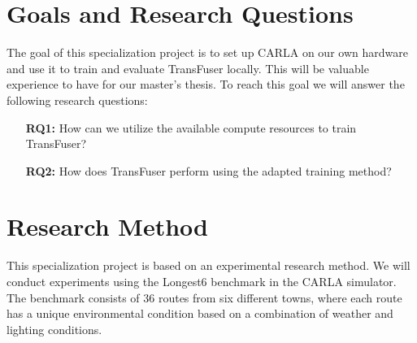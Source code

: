 \section{Goals and Research Questions}
The goal of this specialization project is to set up CARLA on our own hardware and use it to train and evaluate TransFuser locally. This will be valuable experience to have for our master's thesis. To reach this goal we will answer the following research questions:
\begin{itemize}

    \item[\textbf{RQ1:}] How can we utilize the available compute resources to train TransFuser?
    \item[\textbf{RQ2:}] How does TransFuser perform using the adapted training method?
\end{itemize}

\begin{comment}
gammelt:
\begin{itemize}    
    \item \textbf{RQ1:} Hva er state-of-the-art (i et simulert miljø / i CARLA)?
    \item \textbf{RQ2:} Kan vi gjenskape state-of-the-art i CARLA?
    \item \textbf{RQ?:} Hvordan sette opp CARLA i IDUN(?)
    \item \textbf{RQ?:} Can we evaluate the TransFuser model using their pre-trained weights?
    \item \textbf{RQ?:} Can we evaluate the TransFuser model using our re-trained weights?
\end{itemize}    
\end{comment}


\section{Research Method}
This specialization project is based on an experimental research method. We will conduct experiments using the Longest6 benchmark in the CARLA simulator. The benchmark consists of 36 routes from six different towns, where each route has a unique environmental condition based on a combination of weather and lighting conditions.

